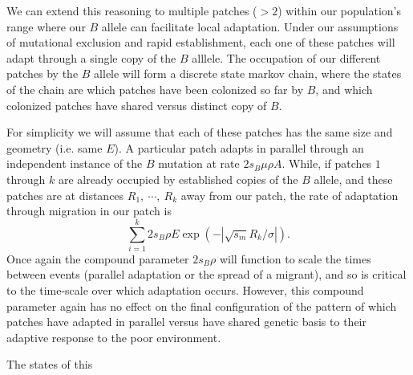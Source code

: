 \documentclass{article}
\begin{document}
We can extend this reasoning to multiple patches ($>2$) within our population's range
where our $B$ allele can facilitate local adaptation. Under our
assumptions of mutational exclusion and rapid establishment, each one
of these patches will adapt through a single copy of the $B$
alllele. The occupation of our different patches by the $B$ allele will form a
discrete state markov chain, where the states of the chain are which patches have
been colonized so far by $B$, and which colonized patches have shared
versus distinct copy of $B$.

For simplicity we will assume that each of these patches has
the same size and geometry (i.e. same $E$). A particular patch adapts in parallel through an independent
instance of the $B$ mutation at rate $2 s_B \mu \rho A$.
While, if patches $1$ through $k$ are already occupied by
established copies of the $B$ allele, and these patches are at
distances $R_1,~\cdots,~R_k$ away from our patch, the rate of
adaptation through migration in our patch is 
\begin{equation}
\sum_{i=1}^{k} 2 s_B \rho E \exp(- |\sqrt{s_m} R_k/\sigma|).
\end{equation}
Once again the compound parameter $2s_B \rho$ will function to
scale the times between events (parallel adaptation or the spread of a
migrant), and so is critical to the time-scale over which
adaptation occurs. However, this compound parameter again has no effect on
the final configuration of the pattern of which patches have adapted
in parallel versus have shared genetic basis to their adaptive
response to the poor environment.

The states of this 

\end{document}

